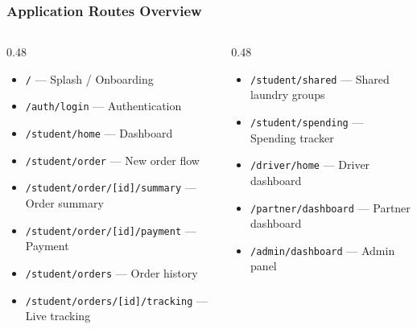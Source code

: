 \documentclass[aspectratio=169,professionalfonts,10pt]{beamer}
\begin{document}
\ugmnormalslide
\begin{frame}
    \frametitle{Application Routes Overview}
    \scriptsize
    \begin{columns}[T]
        \begin{column}{0.48\textwidth}
            \begin{tcolorbox}[colback=cucigoTeal!10,colframe=cucigoTeal,title=\small Student Routes]
                \begin{itemize}\setlength{\itemsep}{0pt}
                    \item \texttt{/} --- Splash / Onboarding
                    \item \texttt{/auth/login} --- Authentication
                    \item \texttt{/student/home} --- Dashboard
                    \item \texttt{/student/order} --- New order flow
                    \item \texttt{/student/order/[id]/summary} --- Order summary
                    \item \texttt{/student/order/[id]/payment} --- Payment
                    \item \texttt{/student/orders} --- Order history
                    \item \texttt{/student/orders/[id]/tracking} --- Live tracking
                \end{itemize}
            \end{tcolorbox}
        \end{column}

        \begin{column}{0.48\textwidth}
            \begin{tcolorbox}[colback=cucigoTeal!10,colframe=cucigoTeal,title=\small Student Routes (cont.)]
                \begin{itemize}\setlength{\itemsep}{0pt}
                    \item \texttt{/student/shared} --- Shared laundry groups
                    \item \texttt{/student/spending} --- Spending tracker
                \end{itemize}
            \end{tcolorbox}

            \vspace{0.3em}

            \begin{tcolorbox}[colback=ugmBlue!10,colframe=ugmBlue,title=\small Other Roles]
                \begin{itemize}\setlength{\itemsep}{0pt}
                    \item \texttt{/driver/home} --- Driver dashboard
                    \item \texttt{/partner/dashboard} --- Partner dashboard
                    \item \texttt{/admin/dashboard} --- Admin panel
                \end{itemize}
            \end{tcolorbox}


\end{column}
\end{columns}
\end{frame}
\end{document}

